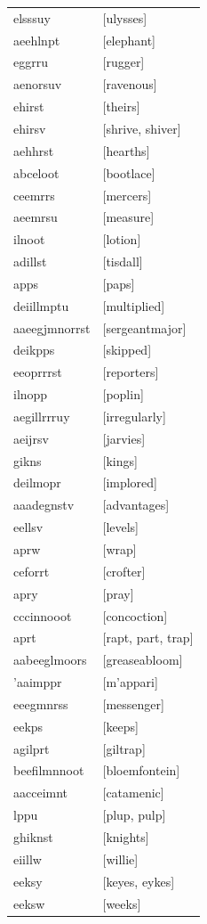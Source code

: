 \documentclass{article}
\begin{document}
\begin{tabular}{ll}
elsssuy & [ulysses] \\
aeehlnpt & [elephant] \\
eggrru & [rugger] \\
aenorsuv & [ravenous] \\
ehirst & [theirs] \\
ehirsv & [shrive, shiver] \\
aehhrst & [hearths] \\
abceloot & [bootlace] \\
ceemrrs & [mercers] \\
aeemrsu & [measure] \\
ilnoot & [lotion] \\
adillst & [tisdall] \\
apps & [paps] \\
deiillmptu & [multiplied] \\
aaeegjmnorrst & [sergeantmajor] \\
deikpps & [skipped] \\
eeoprrrst & [reporters] \\
ilnopp & [poplin] \\
aegillrrruy & [irregularly] \\
aeijrsv & [jarvies] \\
gikns & [kings] \\
deilmopr & [implored] \\
aaadegnstv & [advantages] \\
eellsv & [levels] \\
aprw & [wrap] \\
ceforrt & [crofter] \\
apry & [pray] \\
cccinnooot & [concoction] \\
aprt & [rapt, part, trap] \\
aabeeglmoors & [greaseabloom] \\
'aaimppr & [m'appari] \\
eeegmnrss & [messenger] \\
eekps & [keeps] \\
agilprt & [giltrap] \\
beefilmnnoot & [bloemfontein] \\
aacceimnt & [catamenic] \\
lppu & [plup, pulp] \\
ghiknst & [knights] \\
eiillw & [willie] \\
eeksy & [keyes, eykes] \\
eeksw & [weeks] \\

\end{tabular}
\end{document}
